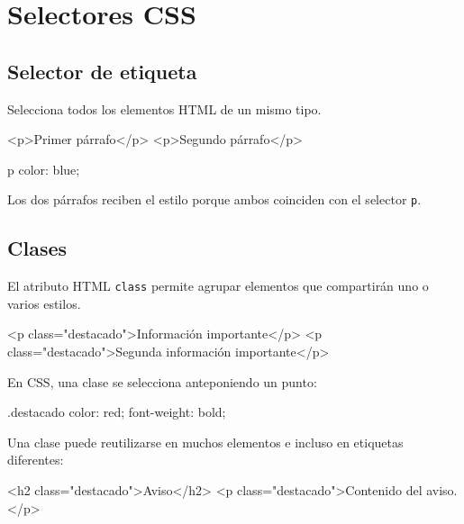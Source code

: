 \documentclass[11pt]{article}
\begin{document}
    \section{Selectores CSS}

    \subsection{Selector de etiqueta}

    Selecciona todos los elementos HTML de un mismo tipo.

    \begin{htmlcodedark}
        <p>Primer párrafo</p>
        <p>Segundo párrafo</p>
    \end{htmlcodedark}

    \begin{csscodedark}
        p {
            color: blue;
        }
    \end{csscodedark}

    Los dos párrafos reciben el estilo porque ambos coinciden con el selector \texttt{p}.

    \subsection{Clases}

    El atributo HTML \texttt{class} permite agrupar elementos que compartirán uno o varios estilos.

    \begin{htmlcodedark}
        <p class="destacado">Información importante</p>
        <p class="destacado">Segunda información importante</p>
    \end{htmlcodedark}

    En CSS, una clase se selecciona anteponiendo un punto:

    \begin{csscodedark}
        .destacado {
            color: red;
            font-weight: bold;
        }
    \end{csscodedark}

    Una clase puede reutilizarse en muchos elementos e incluso en etiquetas diferentes:

    \begin{htmlcodedark}
        <h2 class="destacado">Aviso</h2>
        <p class="destacado">Contenido del aviso.</p>
    \end{htmlcodedark}
\end{document}
